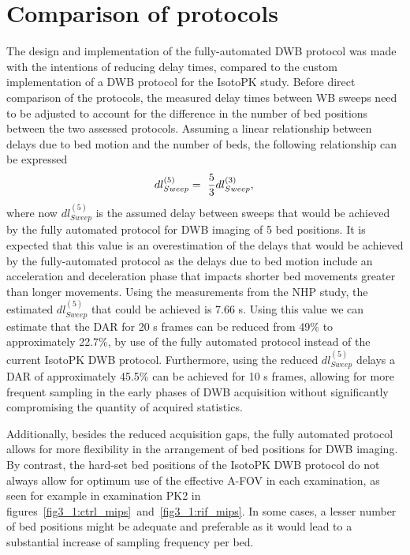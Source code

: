 \section{Comparison of protocols}
The design and implementation of the fully-automated DWB protocol was made with the intentions of reducing delay times, compared to the custom implementation of a DWB protocol for the IsotoPK study. 
Before direct comparison of the protocols, the measured delay times between WB sweeps need to be adjusted to account for the difference in the number of bed positions between the two assessed protocols. 
Assuming a linear relationship between delays due to bed motion and the number of beds, the following relationship can be expressed
%
\begin{equation} \label{eqn:acq_to_dead_time_ratio}
dl_{{Sweep}}^{(5)} =\ \frac{5}{3} dl_{{Sweep}}^{(3)}  \\ , \\ 
\end{equation}
%
where now $dl_{Sweep}^{(5)}$ is the assumed delay between sweeps that would be achieved by the fully automated protocol for DWB imaging of 5 bed positions.
It is expected that this value is an overestimation of the delays that would be achieved by the fully-automated protocol as the delays due to bed motion include an acceleration and deceleration phase that impacts shorter bed movements greater than longer movements.
Using the measurements from the NHP study, the estimated $dl_{Sweep}^{(5)}$ that could be achieved is 7.66 s. 
Using this value we can estimate that the DAR for 20 s frames can be reduced from 49\% to approximately 22.7\%, by use of the fully automated protocol instead of the current IsotoPK DWB protocol. Furthermore, using the reduced $dl_{Sweep}^{(5)}$ delays a DAR of approximately 45.5\% can be achieved for 10 s frames, allowing for more frequent sampling in the early phases of DWB acquisition without significantly compromising the quantity of acquired statistics.

Additionally, besides the reduced acquisition gaps, the fully automated protocol allows for more flexibility in the arrangement of bed positions for DWB imaging. By contrast, the hard-set bed positions of the IsotoPK DWB protocol do not always allow for optimum use of the effective A-FOV in each examination, as seen for example in examination PK2 in figures~\ref{fig3_1:ctrl_mips}~and~\ref{fig3_1:rif_mips}. In some cases, a lesser number of bed positions might be adequate and preferable as it would lead to a substantial increase of sampling frequency per bed.

